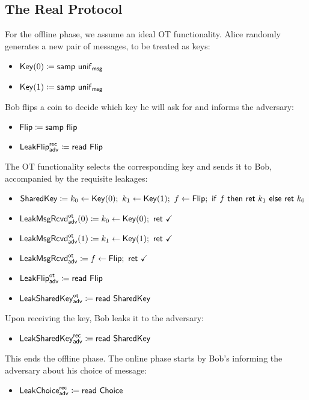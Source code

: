 \subsection{The Real Protocol}
For the offline phase, we assume an ideal OT functionality. Alice randomly generates a new pair of messages, to be treated as keys:
\begin{itemize}
\item $\mathsf{Key}(0) \coloneqq \mathsf{samp} \ \mathsf{unif}_{\mathsf{msg}}$
\item $\mathsf{Key}(1) \coloneqq \mathsf{samp} \ \mathsf{unif}_{\mathsf{msg}}$
\end{itemize}
Bob flips a coin to decide which key he will ask for and informs the adversary:
\begin{itemize}
\item $\mathsf{Flip} \coloneqq \mathsf{samp} \ \mathsf{flip}$
\item {\color{blue} $\mathsf{LeakFlip}^{\mathsf{rec}}_{\mathsf{adv}} \coloneqq \mathsf{read} \ \mathsf{Flip}$}
\end{itemize}
The OT functionality selects the corresponding key and sends it to Bob, accompanied by the requisite leakages:
\begin{itemize}
\item $\SharedKey \coloneqq k_0 \leftarrow \Key(0); \ k_1 \leftarrow \Key(1); \ f \leftarrow \Flip; \ \ifte{f}{\ret{k_1}}{\ret{k_0}}$
\item {\color{blue} $\LeakKeyRcvd^\ot_\adv(0) \coloneqq k_0 \leftarrow \Key(0); \ \ret{\checkmark}$}
\item {\color{blue} $\LeakKeyRcvd^\ot_\adv(1) \coloneqq k_1 \leftarrow \Key(1); \ \ret{\checkmark}$}
\item {\color{blue} $\mathsf{LeakMsgRcvd}^{\mathsf{ot}}_{\mathsf{adv}} \coloneqq f \leftarrow \mathsf{Flip}; \ \mathsf{ret} \ \checkmark$}
\item {\color{blue} $\mathsf{LeakFlip}^{\mathsf{ot}}_{\mathsf{adv}} \coloneqq \mathsf{read} \ \mathsf{Flip}$}
\item {\color{blue} $\mathsf{LeakSharedKey}^{\mathsf{ot}}_{\mathsf{adv}} \coloneqq \mathsf{read} \ \mathsf{SharedKey}$}
\end{itemize}
Upon receiving the key, Bob leaks it to the adversary:
\begin{itemize}
\item {\color{blue} $\mathsf{LeakSharedKey}^{\mathsf{rec}}_{\mathsf{adv}} \coloneqq \mathsf{read} \ \mathsf{SharedKey}$}
\end{itemize}
This ends the offline phase. The online phase starts by Bob's informing the adversary about his choice of message:
\begin{itemize}
\item {\color{blue} $\mathsf{LeakChoice}^{\mathsf{rec}}_{\mathsf{adv}} \coloneqq \mathsf{read} \ \mathsf{Choice}$}
\end{itemize}
